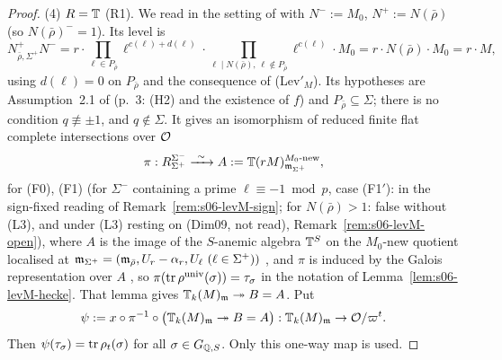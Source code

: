 \begin{proof}
(4) \emph{$R=\mathbb{T}$} (R1). We read \cite[Thm~3.14, p.~12]{KO} in the setting of \cite[\S2.3.1, p.~7]{KO} with $N^-:=M_0$, $N^+:=N(\bar\rho)$ (so
$N(\bar\rho)^-=1$). Its level is \cite[(2.4), p.~7]{KO}
\[N^+_{\bar\rho,\Sigma^+}N^-=r\cdot\prod_{\ell\in P_{\bar\rho}}\ell^{c(\ell)+d(\ell)}\cdot\prod_{\ell\mid N(\bar\rho),\,\ell\notin P_{\bar\rho}}\ell^{c(\ell)}\cdot M_0
=r\cdot N(\bar\rho)\cdot M_0=r\cdot M,\]
using $d(\ell)=0$ on $P_{\bar\rho}$ and the consequence of (Lev$'_M$). Its hypotheses are Assumption~2.1 of \cite{KO} (p.~3: (H2) and the
existence of $f$) and $P_{\bar\rho}\subseteq\Sigma$; there is no condition $q\not\equiv\pm1$, and $q\notin\Sigma$. It gives an isomorphism of
reduced finite flat complete intersections over $\mathcal{O}$
\[\pi:R^{\Sigma^-}_{\Sigma^+}\xrightarrow{\ \sim\ }A:=\T(rM)^{M_0\text{-new}}_{\m_{\Sigma^+}},\]
\stcited{} for (F0), (F1) (for $\Sigma^-$ containing a prime $\ell\equiv-1\bmod p$, case (F1$'$): \stpmc{} in the sign-fixed reading of
Remark~\ref{rem:s06-levM-sign}; for $N(\bar\rho)>1$: false without (L3), and under (L3) resting on \cite[Lemma~2.4]{KO} (Dim09, not read), Remark~\ref{rem:s06-levM-open}), where $A$ is the image of the $S$-anemic algebra $\mathbb{T}^S$ on the $M_0$-new quotient localised at
$\m_{\Sigma^+}=(\m_{\bar\rho},U_r-\alpha_r,U_\ell\ (\ell\in\Sigma^+))$ \cite[p.~4 and p.~12]{KO}, and $\pi$ is induced by the Galois representation over
$A$ \cite[proof of Thm~3.14, p.~13]{KO}, so $\pi(\operatorname{tr}\rho^{\rm univ}(\sigma))=\tau_\sigma$ in the notation of Lemma~\ref{lem:s06-levM-hecke}.
That lemma gives $\mathbb{T}_k(M)_{\mathfrak{m}}\twoheadrightarrow B=A$. Put
\[\psi:=x\circ\pi^{-1}\circ\big(\mathbb{T}_k(M)_{\mathfrak{m}}\twoheadrightarrow B=A\big):\mathbb{T}_k(M)_{\mathfrak{m}}\to\mathcal{O}/\varpi^t.\]
Then $\psi(\tau_\sigma)=\operatorname{tr}\rho_t(\sigma)$ for all $\sigma\in G_{\mathbb{Q},S}$. Only this one-way map is used. \stpmc


\end{proof}
